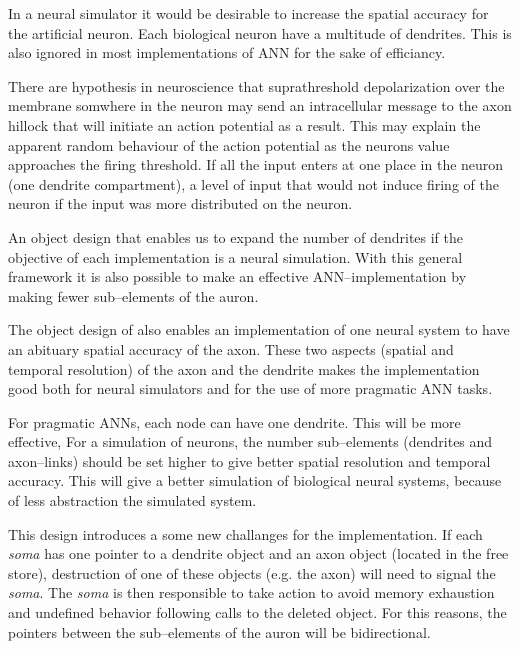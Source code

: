 	In a neural simulator it would be desirable to increase the spatial accuracy for the artificial neuron. 
	Each biological neuron have a multitude of dendrites. This is also ignored in most implementations of ANN for the sake of efficiancy.

	There are hypothesis in neuroscience that suprathreshold depolarization over the membrane somwhere in the neuron may send an intracellular message to the axon hillock that will initiate an action potential as a result.
	This may explain the apparent random behaviour of the action potential as the neurons value approaches the firing threshold. %
	If all the input enters at one place in the neuron (one dendrite compartment), a level of input that would not induce firing of the neuron if the input was more distributed on the neuron.
		
	An object design that enables us to expand the number of dendrites if the objective of each implementation is a neural simulation. 
	With this general framework it is also possible to make an effective ANN--implementation by making fewer sub--elements of the auron.

	The object design of also enables an implementation of one neural system to have an abituary spatial accuracy of the axon. 
	These two aspects (spatial and temporal resolution) of the axon and the dendrite makes the implementation good both for neural simulators and for the use of more pragmatic ANN tasks.

	For pragmatic ANNs, each node can have one dendrite. This will be more effective,
	For a simulation of neurons, the number sub--elements (dendrites and axon--links) should be set higher to give better spatial resolution and temporal accuracy. 
	This will give a better simulation of biological neural systems, because of less abstraction the simulated system.

	
	This design introduces a some new challanges for the implementation. 
	If each \emph{soma} has one pointer to a dendrite object and an axon object (located in the free store), destruction of one of these objects (e.g. the axon) will need to signal the \emph{soma}. 
	The \emph{soma} is then responsible to take action to avoid memory exhaustion and undefined behavior following calls to the deleted object. %
	For this reasons, the pointers between the sub--elements of the auron will be bidirectional. 

